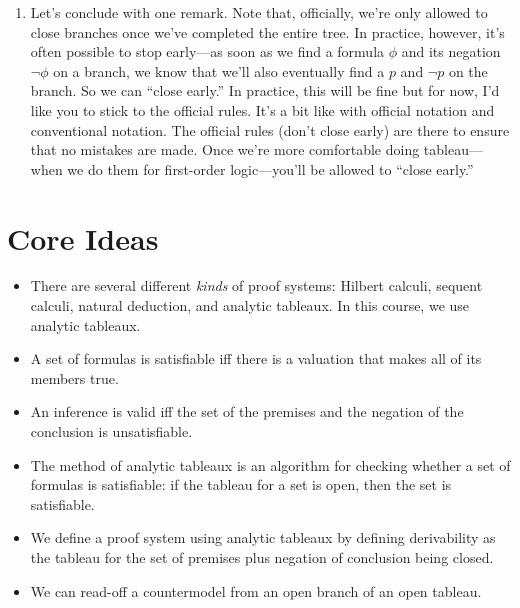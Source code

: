 \begin{enumerate}[\thesection.1]
	\item Let's conclude with one remark. Note that, officially, we're only allowed to close branches once we've completed the entire tree. In practice, however, it's often possible to stop early---as soon as we find a formula $\phi$ and its negation $\neg\phi$ on a branch, we know that we'll also eventually find a $p$ and $\neg p$ on the branch. So we can ``close early.'' In practice, this will be fine but for now, I'd like you to stick to the official rules. It's a bit like with official notation and conventional notation. The official rules (don't close early) are there to ensure that no mistakes are made. Once we're more comfortable doing tableau---when we do them for first-order logic---you'll be allowed to ``close early.''
	
	\end{enumerate}		
					
\section{Core Ideas}

\begin{itemize}

	\item There are several different \emph{kinds} of proof systems: Hilbert calculi, sequent calculi, natural deduction, and analytic tableaux. In this course, we use analytic tableaux. 
	
	\item A set of formulas is satisfiable iff there is a valuation that makes all of its members true.
	
	\item An inference is valid iff the set of the premises and the negation of the conclusion is unsatisfiable.
	
	\item The method of analytic tableaux is an algorithm for checking whether a set of formulas is satisfiable: if the tableau for a set is open, then the set is satisfiable.
	
	\item We define a proof system using analytic tableaux by defining derivability as the tableau for the set of premises plus negation of conclusion being closed.
	
	\item We can read-off a countermodel from an open branch of an open tableau.

\end{itemize}


